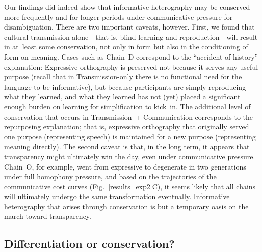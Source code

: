 \documentclass[doc,biblatex]{apa7}
\begin{document}
Our findings did indeed show that informative heterography may be conserved more frequently and for longer periods under communicative pressure for disambiguation. There are two important caveats, however. First, we found that cultural transmission alone---that is, blind learning and reproduction---will result in at~least some conservation, not only in form but also in the conditioning of form on meaning. Cases such as Chain~D correspond to the ``accident of history'' explanation: Expressive orthography is preserved not because it serves any useful purpose (recall that in Transmission-only there is no functional need for the language to be informative), but because participants are simply reproducing what they learned, and what they learned has not (yet) placed a significant enough burden on learning for simplification to kick~in. The additional level of conservation that occurs in Transmission~+ Communication corresponds to the repurposing explanation; that is, expressive orthography that originally served one purpose (representing speech) is maintained for a new purpose (representing meaning directly). The second caveat is that, in the long term, it appears that transparency might ultimately win the day, even under communicative pressure. Chain~O, for example, went from expressive to degenerate in two generations under full homophony pressure, and based on the trajectories of the communicative cost curves (Fig.~\ref{results_exp2}C), it seems likely that all chains will ultimately undergo the same transformation eventually. Informative heterography that arises through conservation is but a temporary oasis on the march toward transparency.

\subsection{Differentiation or conservation?}
\end{document}
